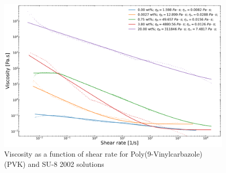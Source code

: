 \begin{figure}[!th]
\centering
\includegraphics[width=\textwidth]{./Figures/plt_PVKwtinSU8.png}
\decoRule
\caption[Viscosity as a function of shear rate for Poly(9-Vinylcarbazole) (PVK) and SU-8 2002 solutions]{Viscosity as a function of shear rate for Poly(9-Vinylcarbazole) (PVK) and SU-8 2002 solutions}
\label{fig:plt_PVKwtinSU8}
\end{figure}